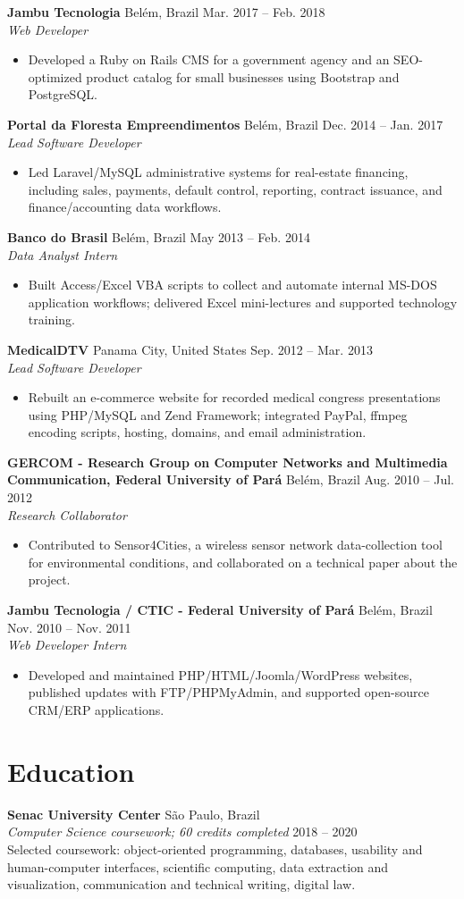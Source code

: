 \documentclass[10pt,a4paper]{article}
\newcommand{\compactentry}[4]{%
  \needspace{3\baselineskip}%
  \textbf{#1} \hfill {\small\color{muted}#2}\\[-0.05em]
  {\emph{#3}}\vspace{-0.25em}
  \begin{itemize}
    #4
  \end{itemize}\vspace{0.05em}
}
\newcommand{\eduentry}[5]{%
  \textbf{#1} \hfill {\small\color{muted}#2}\\[-0.05em]
  {\emph{#3}} \hfill {\small\color{muted}#4}\\[-0.05em]
  {\small #5}\vspace{0.3em}
}
\begin{document}
\compactentry{Jambu Tecnologia }{Belém, Brazil \textbullet{} Mar. 2017 -- Feb. 2018}{Web Developer}{
  \item Developed a Ruby on Rails CMS for a government agency and an SEO-optimized product catalog for small businesses using Bootstrap and PostgreSQL.
}

\compactentry{Portal da Floresta Empreendimentos \normalfont{(contract)}}{Belém, Brazil \textbullet{} Dec. 2014 -- Jan. 2017}{Lead Software Developer}{
  \item Led Laravel/MySQL administrative systems for real-estate financing, including sales, payments, default control, reporting, contract issuance, and finance/accounting data workflows.
}

\compactentry{Banco do Brasil }{Belém, Brazil \textbullet{} May 2013 -- Feb. 2014}{Data Analyst Intern}{
  \item Built Access/Excel VBA scripts to collect and automate internal MS-DOS application workflows; delivered Excel mini-lectures and supported technology training.
}

\compactentry{MedicalDTV }{Panama City, United States \textbullet{} Sep. 2012 -- Mar. 2013}{Lead Software Developer}{
  \item Rebuilt an e-commerce website for recorded medical congress presentations using PHP/MySQL and Zend Framework; integrated PayPal, ffmpeg encoding scripts, hosting, domains, and email administration.
}

\compactentry{GERCOM - Research Group on Computer Networks and Multimedia Communication, Federal University of Pará \normalfont{(intern)}}{Belém, Brazil \textbullet{} Aug. 2010 -- Jul. 2012}{Research Collaborator}{
  \item Contributed to Sensor4Cities, a wireless sensor network data-collection tool for environmental conditions, and collaborated on a technical paper about the project.
}

\compactentry{Jambu Tecnologia / CTIC - Federal University of Pará \normalfont{(intern)}}{Belém, Brazil \textbullet{} Nov. 2010 -- Nov. 2011}{Web Developer Intern}{
  \item Developed and maintained PHP/HTML/Joomla/WordPress websites, published updates with FTP/PHPMyAdmin, and supported open-source CRM/ERP applications.
}

\section{Education}
\eduentry{Senac University Center}{São Paulo, Brazil}{Computer Science coursework; 60 credits completed}{2018 -- 2020}{Selected coursework: object-oriented programming, databases, usability and human-computer interfaces, scientific computing, data extraction and visualization, communication and technical writing, digital law.}
\end{document}
